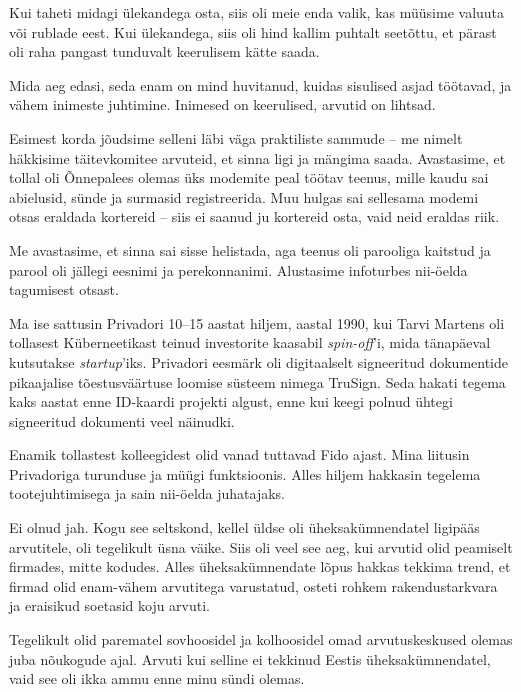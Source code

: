 
Kui taheti midagi ülekandega osta, siis oli meie enda valik, kas 
müüsime valuuta või rublade eest. Kui ülekandega, 
siis oli hind kallim puhtalt seetõttu, et pärast oli raha pangast tunduvalt keerulisem kätte saada.


Mida aeg edasi, seda enam on mind 
huvitanud, kuidas sisulised asjad töötavad, ja vähem 
inimeste juhtimine. Inimesed on keerulised, arvutid on 
lihtsad.


Esimest korda jõudsime selleni läbi väga praktiliste sammude – me nimelt häkkisime 
täitevkomitee arvuteid, et sinna ligi ja mängima saada. 
Avastasime, et tollal oli Õnnepalees olemas üks modemite peal 
töötav teenus, mille kaudu sai abielusid, sünde ja surmasid registreerida. Muu hulgas sai sellesama 
modemi otsas eraldada kortereid – siis ei saanud ju kortereid osta, 
vaid neid eraldas riik.


Me avastasime, et sinna sai sisse helistada, aga teenus oli parooliga kaitstud 
ja parool oli jällegi eesnimi ja perekonnanimi. Alustasime infoturbes nii-öelda 
tagumisest otsast.

Ma ise sattusin Privadori 10–15 aastat hiljem, 
aastal 1990, kui Tarvi Martens oli tollasest Küberneetikast teinud 
investorite kaasabil \emph{spin-off}'i, 
mida tänapäeval kutsutakse \emph{startup}'iks. Privadori eesmärk oli 
digitaalselt signeeritud dokumentide pikaajalise tõestusväärtuse loomise 
süsteem nimega TruSign. Seda hakati tegema kaks aastat enne ID-kaardi 
projekti algust, enne kui keegi polnud ühtegi signeeritud dokumenti veel näinudki.


Enamik tollastest kolleegidest olid vanad tuttavad Fido ajast. Mina liitusin Privadoriga 
turunduse ja müügi funktsioonis. Alles hiljem hakkasin tegelema
tootejuhtimisega ja sain nii-öelda juhatajaks. 


Ei olnud jah. Kogu see seltskond, kellel üldse oli üheksakümnendatel 
ligipääs arvutitele, oli tegelikult üsna väike. Siis oli veel see aeg, kui arvutid olid 
peamiselt firmades, mitte kodudes. Alles üheksakümnendate lõpus hakkas 
tekkima trend, et firmad olid enam-vähem arvutitega varustatud, osteti
rohkem rakendustarkvara ja eraisikud soetasid koju arvuti.

Tegelikult olid parematel sovhoosidel ja kolhoosidel omad 
arvutuskeskused olemas juba nõukogude ajal. Arvuti kui selline ei 
tekkinud Eestis üheksakümnendatel, vaid see oli ikka ammu enne minu sündi 
olemas.
